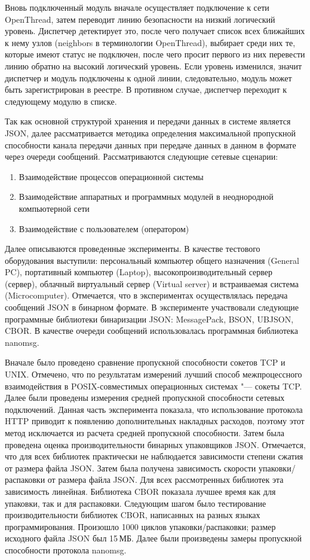 Вновь подключенный модуль вначале осуществляет подключение к сети OpenThread, затем переводит линию безопасности на низкий логический уровень. Диспетчер детектирует это, после чего получает список всех ближайших к нему узлов (neighbors в терминологии OpenThread), выбирает среди них те, которые имеют статус не подключен, после чего просит первого из них перевести линию обратно на высокий логический уровень. Если уровень изменился, значит диспетчер и модуль подключены к одной линии, следовательно, модуль может быть зарегистрирован в реестре. В противном случае, диспетчер переходит к следующему модулю в списке.

Так как основной структурой хранения и передачи данных в системе является JSON, далее рассматривается методика определения максимальной пропускной способности канала передачи данных при передаче данных в данном в формате через очереди сообщений. Рассматриваются следующие сетевые сценарии:

\begin{enumerate}
	\item Взаимодействие процессов операционной системы
	\item Взаимодействие аппаратных и программных модулей в неоднородной компьютерной сети
	\item Взаимодействие с пользователем (оператором)	
\end{enumerate}

Далее описываются проведенные эксперименты. В качестве тестового оборудования выступили: персональный компьютер общего назначения (General PC), портативный компьютер (Laptop), высокопроизводительный сервер (сервер), облачный виртуальный сервер (Virtual server) и встраиваемая система (Microcomputer). Отмечается, что в экспериментах осуществлялась передача сообщений JSON в бинарном формате. В эксперименте участвовали следующие программные библиотеки бинаризации JSON: MessagePack, BSON, UBJSON, CBOR. В качестве очереди сообщений использовалась программная библиотека nanomsg.

Вначале было проведено сравнение пропускной способности сокетов TCP и UNIX. Отмечено, что по результатам измерений лучший способ межпроцессного взаимодействия в POSIX-совместимых операционных системах "--- сокеты TCP. Далее были проведены измерения средней пропускной способности сетевых подключений. Данная часть эксперимента показала, что использование протокола HTTP приводит к появлению дополнительных накладных расходов, поэтому этот метод исключается из расчета средней пропускной способности. Затем была проведена оценка производительности бинарных упаковщиков JSON. Отмечается, что для всех библиотек практически не наблюдается зависимости степени сжатия от размера файла JSON. Затем была получена зависимость скорости упаковки/распаковки от размера файла JSON. Для всех рассмотренных библиотек эта зависимость линейная. Библиотека CBOR показала лучшее время как для упаковки, так и для распаковки.
Следующим шагом было тестирование производительности библиотек CBOR, написанных на разных языках программирования. Произошло 1000 циклов упаковки/распаковки; размер исходного файла JSON был 15\,МБ. Далее были произведены замеры пропускной способности протокола nanomsg. 

